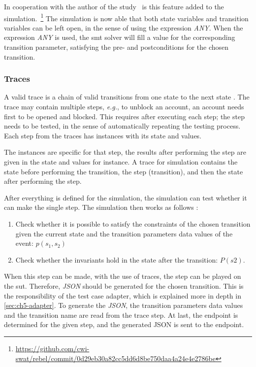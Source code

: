 In cooperation with the author of the study~\cite{stoel_storm_vinju_bosman_2016} is this feature added to the simulation.~\footnote{\url{https://github.com/cwi-swat/rebel/commit/0d29eb30a82cc5dd6d8be750daa4a24e4e2786be}}
The simulation is now able that both state variables and transition variables
can be left open, in the sense of using the expression \textit{ANY}. When the
expression \textit{ANY} is used, the \gls{smt} solver will fill a value for the
corresponding transition parameter, satisfying the pre- and postconditions for
the chosen transition. 

\subsubsection*{Traces}\label{sec:ch5-traces}
A valid trace is a chain of valid transitions from one state to the next state
\cite[p.5]{stoel_storm_vinju_bosman_2016}. The trace may contain multiple steps,
\textit{e.g.}, to unblock an account, an account needs first to be opened and
blocked. This requires after executing each step; the step needs to be tested,
in the sense of automatically repeating the testing process. Each step from the
traces has instances with its state and values.

The instances are specific
for that step, the results after performing the step are given in the state and
values for instance. A trace for simulation contains the state before
performing the transition, the step (transition), and then the state after
performing the step.

After everything is defined for the simulation, the simulation can test whether
it can make the single step. The simulation then works as follows
\cite[p.6]{stoel_storm_vinju_bosman_2016}:
\begin{enumerate}
\item Check whether it is possible to satisfy the constraints of the chosen
transition given the current state and the transition parameters data values of
the event: $p(s_{1}, s_{2})$
\item Check whether the invariants hold in the state after the transition:
$P(s2)$.
\end{enumerate}

When this step can be made, with the use of traces, the step can be played on
the \gls{sut}. Therefore, \textit{JSON} should be generated for the chosen
transition. This is the responsibility of the test case adapter, which is
explained more in depth in \autoref{sec:ch5-adapter}. To generate the
\textit{JSON}, the transition parameters data values and
the transition name are read from the trace step. At last, the endpoint is
determined for the given step, and the generated JSON is sent to the endpoint.

